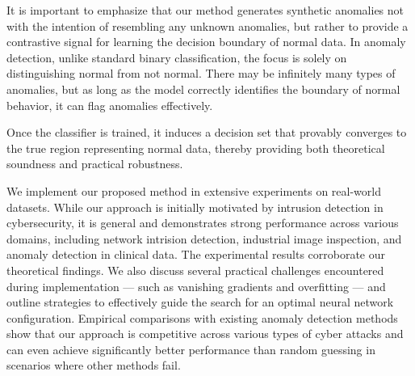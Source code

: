 \documentclass{article}
\begin{document}
It is important to emphasize that our method generates synthetic anomalies not with the intention of resembling any unknown anomalies, but rather to provide a contrastive signal for learning the decision boundary of normal data. In anomaly detection, unlike standard binary classification, the focus is solely on distinguishing normal from not normal. There may be infinitely many types of anomalies, but as long as the model correctly identifies the boundary of normal behavior, it can flag anomalies effectively.

Once the classifier is trained, it induces a decision set that provably converges to the true region representing normal data, thereby providing both theoretical soundness and practical robustness.


 
We implement our proposed method in extensive experiments on real-world datasets. While our approach is initially motivated by intrusion detection in cybersecurity, it is general and demonstrates strong performance across various domains, including network intrision detection, industrial image inspection, and anomaly detection in clinical data. The experimental results corroborate our theoretical findings. We also discuss several practical challenges encountered during implementation --- such as vanishing gradients and overfitting --- and outline strategies to effectively guide the search for an optimal neural network configuration. Empirical comparisons with existing anomaly detection methods show that our approach is competitive across various types of cyber attacks and can even achieve significantly better performance than random guessing in scenarios where other methods fail.




\end{document}
